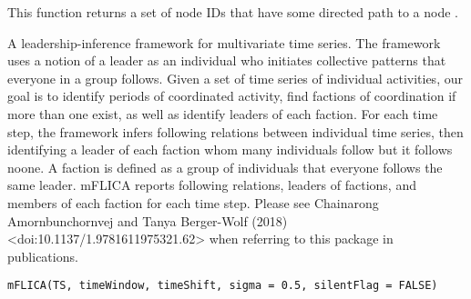 \documentclass[a4paper]{book}
\begin{document}
%
\begin{Value}
This function returns a set of node IDs  that have some directed path to a node .
\end{Value}
%
\begin{Examples}
\end{Examples}
%
\begin{Description}\relax
A leadership-inference framework for multivariate time series. The framework uses a notion of a leader as an individual who initiates collective patterns that everyone in a group follows. Given a set of time series of individual activities, our goal is to identify periods of coordinated activity, find factions of coordination if more than one exist, as well as identify leaders of each faction. For each time step, the framework infers following relations between individual time series, then identifying a leader of each faction whom many individuals follow but it follows noone. A faction is defined as a group of individuals that everyone follows the same leader. mFLICA reports following relations, leaders of factions, and members of each faction for each time step. Please see Chainarong Amornbunchornvej and Tanya Berger-Wolf (2018) <doi:10.1137/1.9781611975321.62> when referring to this package in publications.
\end{Description}
%
\begin{Usage}
\begin{verbatim}
mFLICA(TS, timeWindow, timeShift, sigma = 0.5, silentFlag = FALSE)
\end{verbatim}
\end{Usage}
%
\end{document}
